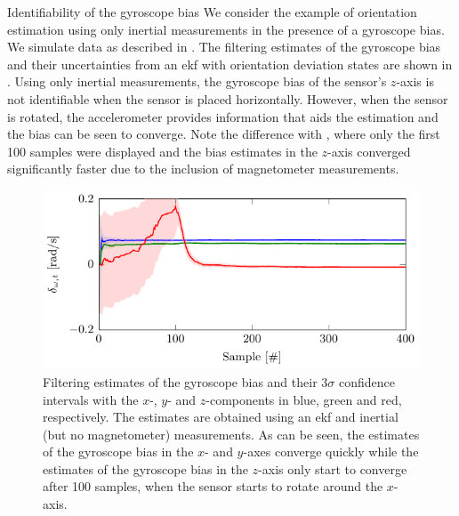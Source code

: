 \begin{myexample}{Identifiability of the gyroscope bias}%
\label{ex:calibration-ident}%
We consider the example of orientation estimation using only inertial measurements in the presence of a gyroscope bias. We simulate data as described in . The filtering estimates of the gyroscope bias and their uncertainties from an \gls{ekf} with orientation deviation states are shown in . Using only inertial measurements, the gyroscope bias of the sensor's $z$-axis is not identifiable when the sensor is placed horizontally. However, when the sensor is rotated, the accelerometer provides information that aids the estimation and the bias can be seen to converge. Note the difference with , where only the first 100 samples were displayed and the bias estimates in the $z$-axis converged significantly faster due to the inclusion of magnetometer measurements. 

\begin{figure}
	\centering
    	\includegraphics[scale = 1]{figure5_2.pdf}
    	\caption{Filtering estimates of the gyroscope bias and their $3 \sigma$ confidence intervals with the $x$-, $y$- and $z$-components in blue, green and red, respectively. The estimates are obtained using an \gls{ekf} and inertial (but no magnetometer) measurements. As can be seen, the estimates of the gyroscope bias in the $x$- and $y$-axes converge quickly while the estimates of the gyroscope bias in the $z$-axis only start to converge after 100 samples, when the sensor starts to rotate around the $x$-axis.}
	\label{fig:calibration-identifiability}
\end{figure}
\end{myexample}
